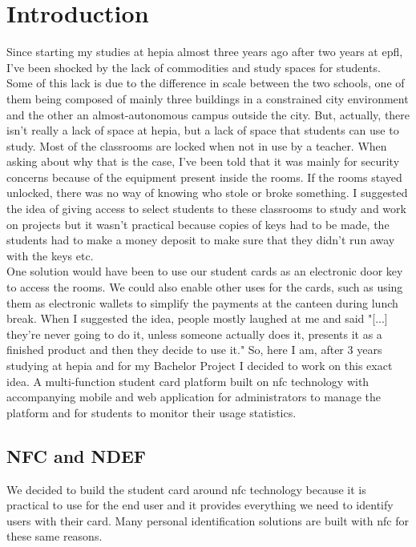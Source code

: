 \documentclass[twoside, openright,11pt,a4paper]{book}
\begin{document}
\chapter{Introduction}
Since starting my studies at hepia almost three years ago after two years at \gls{epfl}, I've been shocked by the lack of commodities and study spaces for students. Some of this lack is due to the difference in scale between the two schools, one of them being composed of mainly three buildings in a constrained city environment and the other an almost-autonomous campus outside the city. But, actually, there isn't really a lack of space at hepia, but a lack of space that students can use to study. Most of the classrooms are locked when not in use by a teacher. When asking about why that is the case, I've been told that it was mainly for security concerns because of the equipment present inside the rooms. If the rooms stayed unlocked, there was no way of knowing who stole or broke something. I suggested the idea of giving access to select students to these classrooms to study and work on projects but it wasn't practical because copies of keys had to be made, the students had to make a money deposit to make sure that they didn't run away with the keys etc.\\ 

One solution would have been to use our student cards as an electronic door key to access the rooms. We could also enable other uses for the cards, such as using them as electronic wallets to simplify the payments at the canteen during lunch break. When I suggested the idea, people mostly laughed at me and said "[...] they're never going to do it, unless someone actually does it, presents it as a finished product and then they decide to use it." So, here I am, after 3 years studying at hepia and for my Bachelor Project I decided to work on this exact idea. A multi-function student card platform built on \gls{nfc} technology with accompanying mobile and web application for administrators to manage the platform and for students to monitor their usage statistics.


\section{NFC and NDEF}
We decided to build the student card around \gls{nfc} technology because it is practical to use for the end user and it provides everything we need to identify users with their card. Many personal identification solutions are built with \gls{nfc} for these same reasons.
\end{document}
